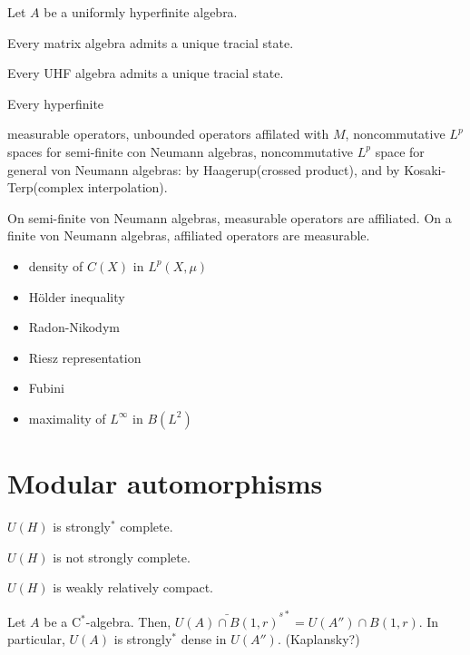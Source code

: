 \documentclass{../../large}
\begin{document}
\begin{prb}
Let $A$ be a uniformly hyperfinite algebra.
\begin{parts}
\item Every matrix algebra admits a unique tracial state.
\item Every UHF algebra admits a unique tracial state.
\item Every hyperfinite 
\end{parts}
\end{prb}


measurable operators,
unbounded operators affilated with $M$,
noncommutative $L^p$ spaces for semi-finite con Neumann algebras,
noncommutative $L^p$ space for general von Neumann algebras: by Haagerup(crossed product), and by Kosaki-Terp(complex interpolation).

On semi-finite von Neumann algebras, measurable operators are affiliated.
On a finite von Neumann algebras, affiliated operators are measurable.


\begin{itemize}
\item density of $C(X)$ in $L^p(X,\mu)$
\item H\"older inequality
\item Radon-Nikodym
\item Riesz representation
\item Fubini
\item maximality of $L^\infty$ in $B(L^2)$
\end{itemize}




\section{Modular automorphisms}


\begin{prb}
\begin{parts}
\item $U(H)$ is strongly$^*$ complete.
\item $U(H)$ is not strongly complete.
\item $U(H)$ is weakly relatively compact.
\end{parts}
\end{prb}


Let $A$ be a C$^*$-algebra.
Then, $\bar{U(A)\cap B(1,r)}^{s*}=U(A'')\cap B(1,r)$.
In particular, $U(A)$ is strongly$^*$ dense in $U(A'')$.
(Kaplansky?)
\end{document}
